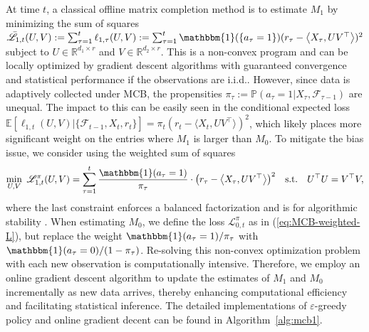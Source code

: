 \documentclass[12pt]{article}
\newcommand{\PP}{\mathbb{P}}
\def\calF{{\mathcal F}}
\def\EE{{\mathbb E}}
\def\PP{{\mathbb P}}
\def\RR{{\mathbb R}}
\def\hat{\widehat}
\def\eps{\varepsilon}
\def\tilde{\widetilde}
\theoremstyle{plain}
\begin{document}
At time $t$, a classical offline matrix completion method \citep{keshavan2009matrix} is to estimate $M_1$ by minimizing the sum of squares 
$
\bar{\mathscr{L}}_{1,t}(U,V):=\sum_{\tau=1}^t \ell_{1,\tau}(U,V):=\sum_{\tau=1}^t \mathbbm{1}(\{a_{\tau}=1\}) (r_{\tau}-\big<X_{\tau}, UV^{\top}\big>)^2
$
subject to $U\in\RR^{d_1\times r}$ and $V\in\RR^{d_2\times r}$. This is a non-convex program and can be locally optimized by gradient descent algorithms with guaranteed convergence and statistical performance \citep{burer2003nonlinear, zheng2016convergence} if the observations are i.i.d.. However, since data is adaptively collected under MCB, the propensities $\pi_{\tau}:=\PP(a_{\tau}=1| X_{\tau},\mathcal{F}_{\tau-1})$ are unequal.  The impact to this can be easily seen in the conditional expected loss $\EE [\ell_{1,t}(U,V)|\{\calF_{t-1},X_t, r_t\}]=\pi_t(r_t-\langle X_t, UV^{\top}\rangle)^2$, which likely places more significant weight on the entries where $M_1$ is larger than $M_0$. To mitigate the bias issue, we consider using the weighted sum of squares
\begin{align}\label{eq:MCB-weighted-L}
	\min_{U,V}\ \mathscr{L}^{\pi}_{1,t}(U,V)=\sum_{\tau=1}^t \frac{\mathbbm{1}(a_{\tau}=1)}{\pi_{\tau}}\cdot \big(r_{\tau}-\big<X_{\tau}, UV^{\top}\big>\big)^2\quad {\rm s.t.}\quad U^{\top}U=V^{\top}V,
\end{align}
where the last constraint enforces a balanced factorization and is for algorithmic stability \citep{jin2016provable}.  When estimating $M_0$, we define the loss $\mathscr{L}_{0,t}^{\pi}$ as in (\ref{eq:MCB-weighted-L}), but replace the weight $\mathbbm{1}(a_{\tau}=1)/\pi_{\tau}$ with $\mathbbm{1}(a_{\tau}=0)/(1-\pi_{\tau})$.  Re-solving this non-convex optimization problem with each new observation is computationally intensive. Therefore, we employ an online gradient descent algorithm to update the estimates of $M_1$ and 
$M_0$ incrementally as new data arrives, thereby enhancing computational efficiency and facilitating statistical inference. The detailed implementations of $\eps$-greedy policy and online  gradient decent can be found in Algorithm~\ref{alg:mcb1}.


\end{document}
